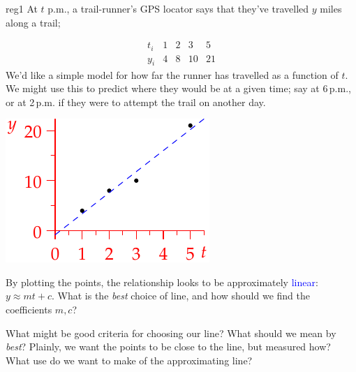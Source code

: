 \begin{example}{}{reg1}
	At $t$ p.m., a trail-runner's GPS locator says that they've travelled $y$ miles along a trail;\par
	\begin{minipage}[t]{0.64\linewidth}\vspace{-11pt}
		\[
			\begin{array}{c|ccccc}
			t_i&1&2&3&5\\\hline
			y_i&4&8&10&21
			\end{array}
		\]
		We'd like a simple model for how far the runner has travelled as a function of $t$. We might use this to predict where they would be at a given time; say at 6\,p.m., or at 2\,p.m.{} if they were to attempt the trail on another day.
	\end{minipage}
	\hfill
	\begin{minipage}[t]{0.35\linewidth}\vspace{-3pt}
		\flushright\includegraphics{reg-line}
	\end{minipage}
	\smallbreak
	By plotting the points, the relationship looks to be approximately\footnotemark{} \textcolor{blue}{linear}: $y\approx mt+c$. What is the \emph{best} choice of line, and how should we find the coefficients $m,c$?\medbreak

	What might be good criteria for choosing our line? What should we mean by \emph{best}? Plainly, we want the points to be close to the line, but measured how? What use do we want to make of the approximating line?\smallbreak


\end{example}
